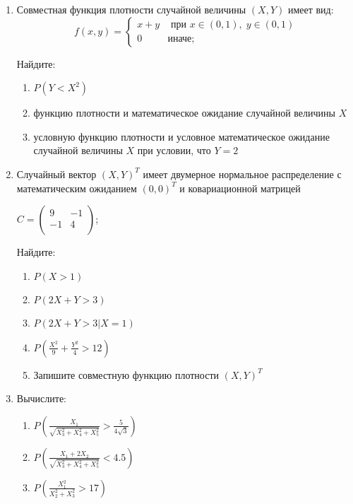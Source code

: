\begin{enumerate}
\item  Совместная функция плотности случайной величины $(X,Y)$ имеет вид:
\begin{equation*}
f(x,y) =
 \begin{cases}
   x+y &\text{ при }x \in (0,1),\;y \in (0,1) \\
   0 &\text{иначе};
 \end{cases}
\end{equation*}

Найдите:
\begin{enumerate}
\item $P(Y<X^2)$
\item функцию плотности и математическое ожидание случайной величины $X$
\item условную функцию плотности и условное математическое ожидание случайной величины $X$ при условии, что $Y=2$
\end{enumerate}

\item Случайный вектор $(X,Y)^T$ имеет двумерное нормальное распределение с математическим ожиданием $(0,0)^T$ и ковариационной матрицей

$C = \begin{pmatrix}
9 & -1 \\
-1 & 4 \\
\end{pmatrix}$;

Найдите:
\begin{enumerate}
\item $P(X>1)$
\item $P(2X+Y>3)$
\item $P(2X+Y>3|X=1)$
\item $P\left(\frac{X^2}{9}+\frac{Y^2}{4} >12\right)$
\item Запишите совместную функцию плотности  $(X,Y)^T$
\end{enumerate}

\item Вычислите:
\begin{enumerate}
\item $P\left(\frac{X_1}{\sqrt{X_3^2+X_4^2+X_5^2}}>\frac{5}{4\sqrt{3}}\right)$
\item $P\left(\frac{X_1+2X_2}{\sqrt{X_3^2+X_4^2+X_5^2}}<4.5\right)$
\item $P\left(\frac{X_1^2}{X_2^2+X_3^2}>17\right)$
\end{enumerate}


\end{enumerate}
